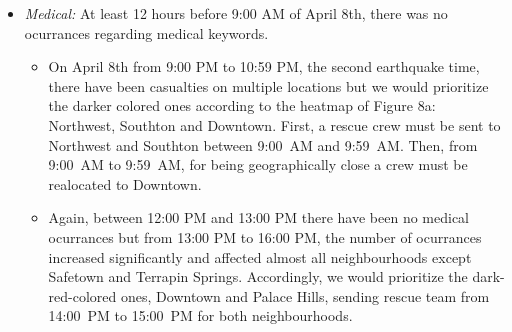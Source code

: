 \begin{itemize}                                                                  
     \item \emph{Medical:} At least 12 hours before 9:00 AM of April 8th, there was no ocurrances regarding
medical keywords. 
\begin{itemize} 
\item On April 8th from 9:00 PM to 10:59 PM, the second earthquake
time, there have been casualties on multiple locations
but we would prioritize the darker colored ones according to the heatmap of Figure 8a:
Northwest, Southton and Downtown. First, a rescue crew must be sent to Northwest
and Southton between     
     9:00~AM and 9:59~AM. Then, from 9:00~AM to 9:59~AM, for being geographically close a crew must be realocated to
Downtown. 

\item Again, between 12:00 PM and 13:00 PM there have been no medical ocurrances but from 13:00 PM
to 16:00 PM, the number of ocurrances increased significantly and affected
almost all neighbourhoods except Safetown and Terrapin Springs. Accordingly, we
would prioritize the dark-red-colored ones, Downtown and Palace Hills, sending
rescue team from 14:00~PM to 15:00~PM for both neighbourhoods.  


\end{itemize}
\end{itemize}
